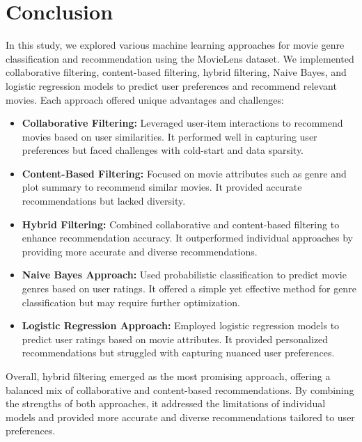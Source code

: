\documentclass[a4paper]{article}
\theoremstyle{plain}
\theoremstyle{definition}
\begin{document}
\newpage

\section{Conclusion}


        In this study, we explored various machine learning approaches for movie genre classification and recommendation using the MovieLens dataset. We implemented collaborative filtering, content-based filtering, hybrid filtering, Naive Bayes, and logistic regression models to predict user preferences and recommend relevant movies. Each approach offered unique advantages and challenges:

        \begin{itemize}
            \item \textbf{Collaborative Filtering:} Leveraged user-item interactions to recommend movies based on user similarities. It performed well in capturing user preferences but faced challenges with cold-start and data sparsity.
            \item \textbf{Content-Based Filtering:} Focused on movie attributes such as genre and plot summary to recommend similar movies. It provided accurate recommendations but lacked diversity.
            \item \textbf{Hybrid Filtering:} Combined collaborative and content-based filtering to enhance recommendation accuracy. It outperformed individual approaches by providing more accurate and diverse recommendations.
            \item \textbf{Naive Bayes Approach:} Used probabilistic classification to predict movie genres based on user ratings. It offered a simple yet effective method for genre classification but may require further optimization.
            \item \textbf{Logistic Regression Approach:} Employed logistic regression models to predict user ratings based on movie attributes. It provided personalized recommendations but struggled with capturing nuanced user preferences.
        \end{itemize}

        Overall, hybrid filtering emerged as the most promising approach, offering a balanced mix of collaborative and content-based recommendations. By combining the strengths of both approaches, it addressed the limitations of individual models and provided more accurate and diverse recommendations tailored to user preferences.
\end{document}
